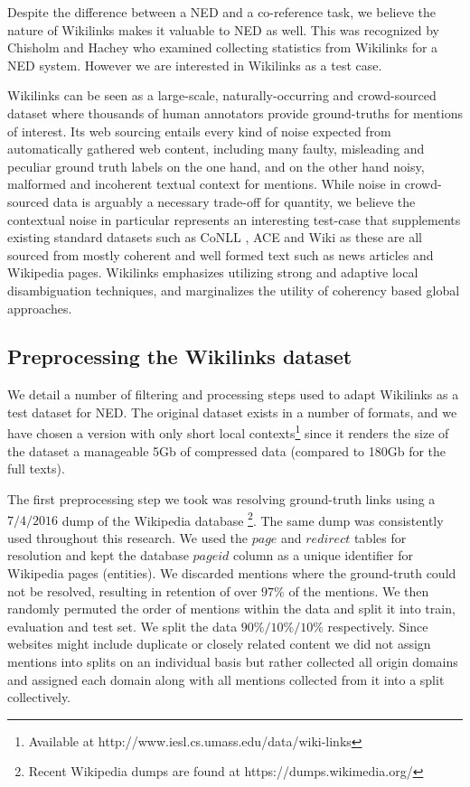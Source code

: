 \documentclass[11pt]{article}
\begin{document}
	Despite the difference between a NED and a co-reference task, we believe the nature of Wikilinks makes it valuable to NED as well. This was recognized by Chisholm and Hachey \cite{chisholm2015entity} who examined collecting statistics from Wikilinks for a NED system. However we are interested in Wikilinks as a test case. 
	
	Wikilinks can be seen as a large-scale, naturally-occurring and crowd-sourced dataset where thousands of human annotators provide ground-truths for mentions of interest. Its web sourcing entails every kind of noise expected from automatically gathered web content, including many faulty, misleading and peculiar ground truth labels on the one hand, and on the other hand noisy, malformed and incoherent textual context for mentions. While noise in crowd-sourced data is arguably a necessary trade-off for quantity, we believe the contextual noise in particular represents an interesting test-case that supplements existing standard datasets such as CoNLL \cite{hoffart2011robust}, ACE and Wiki \cite{ratinov2011local} as these are all sourced from mostly coherent and well formed text such as news articles and Wikipedia pages. Wikilinks emphasizes utilizing strong and adaptive local disambiguation techniques, and marginalizes the utility of coherency based global approaches.
	
	\subsection{Preprocessing the Wikilinks dataset}
	
	We detail a number of filtering and processing steps used to adapt Wikilinks as a test dataset for NED. The original dataset exists in a number of formats, and we have chosen a version with only short local contexts\footnote{Available at http://www.iesl.cs.umass.edu/data/wiki-links} since it renders the size of the dataset a manageable 5Gb of compressed data (compared to 180Gb for the full texts).
	
	The first preprocessing step we took was resolving ground-truth links using a $7/4/2016$ dump of the Wikipedia database \footnote{Recent Wikipedia dumps are found at https://dumps.wikimedia.org/}. The same dump was consistently used throughout this research. We used the $page$ and $redirect$ tables for resolution and kept the database $pageid$ column as a unique identifier for Wikipedia pages (entities). We discarded mentions where the ground-truth could not be resolved, resulting in retention of over $97\%$ of the mentions. We then randomly permuted the order of mentions within the data and split it into train, evaluation and test set. We split the data $90\% / 10\% / 10\%$ respectively. Since websites might include duplicate or closely related content we did not assign mentions into splits on an individual basis but rather collected all origin domains and assigned each domain along with all mentions collected from it into a split collectively.
	
\end{document}
